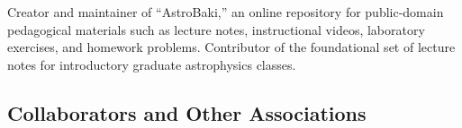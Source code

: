 \documentclass[apjpt4]{aastex}
\begin{document}
Creator and maintainer of ``AstroBaki,'' an online repository for public-domain
pedagogical materials such as lecture notes, instructional videos, laboratory
exercises, and homework problems.  Contributor of the foundational
set of lecture notes for introductory graduate astrophysics classes.


\subsection*{Collaborators and Other Associations}
\vspace{-8pt}

%
%
%
\end{document}
